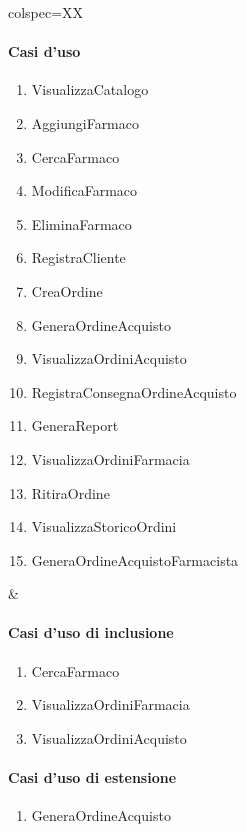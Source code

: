 \begin{table}[!hbp]
	\centering
	\begin{tblr}{colspec=XX}
		\begin{minipage}[t]{\linewidth}
			\paragraph{Casi d'uso}
			\begin{enumerate}
				\item VisualizzaCatalogo %
				\item AggiungiFarmaco %
				\item CercaFarmaco %
				\item ModificaFarmaco %
				\item EliminaFarmaco %
				\item RegistraCliente %
				\item CreaOrdine %
				\item GeneraOrdineAcquisto %
				\item VisualizzaOrdiniAcquisto %
				\item RegistraConsegnaOrdineAcquisto %
				\item GeneraReport %
				\item VisualizzaOrdiniFarmacia %
				\item RitiraOrdine %
				\item VisualizzaStoricoOrdini %
				\item GeneraOrdineAcquistoFarmacista %
			\end{enumerate}
		\end{minipage} &
		\begin{minipage}[t]{\linewidth}
			\paragraph{Casi d'uso di inclusione}
			\begin{enumerate}
				\item CercaFarmaco
				\item VisualizzaOrdiniFarmacia
				\item VisualizzaOrdiniAcquisto
			\end{enumerate}

			\paragraph{Casi d'uso di estensione}
			\begin{enumerate}
				\item GeneraOrdineAcquisto %
			\end{enumerate}
		\end{minipage}
	\end{tblr}
\end{table}

